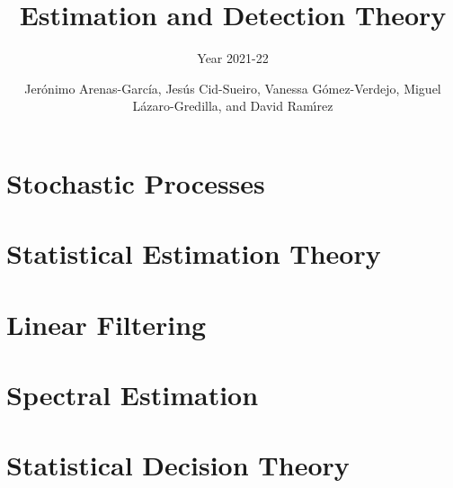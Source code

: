 \documentclass[graybox,envcountchap,sectrefs]{svmono_mod}
\begin{document}
\author{Jer\'onimo Arenas-Garc\'ia, Jes\'us Cid-Sueiro, Vanessa G\'omez-Verdejo, Miguel L\'azaro-Gredilla, and David Ram{\'\i}rez}
\title{Estimation and Detection Theory}
\subtitle{Year 2021-22}
\maketitle

\frontmatter


\chapter{Stochastic Processes}
%


%
\chapter{Statistical Estimation Theory}


\chapter{Linear Filtering}
\label{cha:FiltradoLinea}
%

\chapter{Spectral Estimation}
%
%

\chapter{Statistical Decision Theory}
\label{ch:SDT}


\tableofcontents
%
\mainmatter%




%


%
\end{document}
